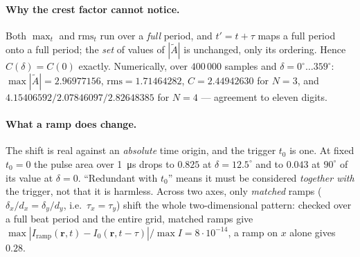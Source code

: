 \documentclass[11pt,a4paper]{article}
\newcommand{\crest}{\ensuremath{C}}
\begin{document}
\paragraph{Why the crest factor cannot notice.} Both $\max_t$ and
$\mathrm{rms}_t$ run over a \emph{full} period, and $t'=t+\tau$ maps a full
period onto a full period; the \emph{set} of values of $|\tilde A|$ is
unchanged, only its ordering. Hence $\crest(\delta)=\crest(0)$ exactly.
Numerically, over $400\,000$ samples and $\delta=0^\circ\dots359^\circ$:
$\max|\tilde A|=2.96977156$, $\mathrm{rms}=1.71464282$,
$\crest=2.44942630$ for $N=3$, and $4.15406592/2.07846097/2.82648385$ for
$N=4$ --- agreement to eleven digits.

\paragraph{What a ramp does change.} The shift is real against an
\emph{absolute} time origin, and the trigger $t_0$ is one. At fixed $t_0=0$ the
pulse area over \SI{1}{\micro\second} drops to $0.825$ at
$\delta=12.5^\circ$ and to $0.043$ at $90^\circ$ of its value at $\delta=0$.
``Redundant with $t_0$'' means it must be considered \emph{together with} the
trigger, not that it is harmless. Across two axes, only \emph{matched} ramps
($\delta_x/d_x=\delta_y/d_y$, i.e.\ $\tau_x=\tau_y$) shift the whole
two-dimensional pattern: checked over a full beat period and the entire grid,
matched ramps give
$\max|I_\mathrm{ramp}(\mathbf r,t)-I_0(\mathbf r,t-\tau)|/\max I=8\cdot10^{-14}$,
a ramp on $x$ alone gives $0.28$.
\end{document}

